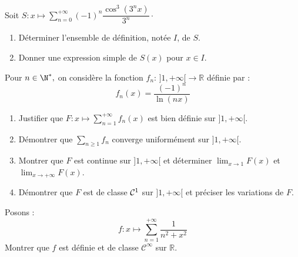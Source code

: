 \documentclass[a4paper,twoside,french,11pt]{VcCours}
\newcommand{\Sum}[2]{\sum_{#1}^{#2}}
\begin{document}
\newpage
\begin{Exercice}{} Soit $S : x \mapsto \sum_{n=0}^{+ \infty}  (-1)^n \dfrac{\cos^3(3^nx)}{3^n} \cdot$

\begin{enumerate}
\item Déterminer l'ensemble de définition, notée $I$, de $S$.
\item Donner une expression simple de $S(x)$ pour $x \in I$.
\end{enumerate}
\end{Exercice}





\begin{Exercice}{} Pour $n\in\N^*,$ on considère la fonction $f_n : \, ] 1,+\infty[ \rightarrow \mathbb{R}$ définie par :
$$ f_n(x)=\frac{(-1)^n}{\ln(nx)}$$

\begin{enumerate}
	\item Justifier que $F : x\longmapsto \sum_{n=1}^{+\infty} f_n(x)$ est bien définie sur $]1,+\infty[.$
	
	\item Démontrer que $\Sum{n\geq 1}{} f_n$ converge uniformément sur $]1,+\infty[.$ 
	
	\item Montrer que $F$ est continue sur $]1,+\infty[$ et déterminer $\lim_{x \rightarrow 1}F(x)$ et  $\lim_{x \rightarrow  +\infty}F(x)$.
	
	\item Démontrer que $F$ est de classe ${\cal C}^1$ sur $]1,+\infty[$ et préciser les variations de $F.$
\end{enumerate}
\end{Exercice}



 

\begin{Exercice}[$\bigstar$] Posons :
$$f: x \mapsto \sum_{n=1}^{+ \infty} \dfrac{1}{n^2+x^2}$$
Montrer que $f$ est définie et de classe $\mathcal{C}^{\infty}$ sur $\mathbb{R}$.
\end{Exercice} 
\end{document}
